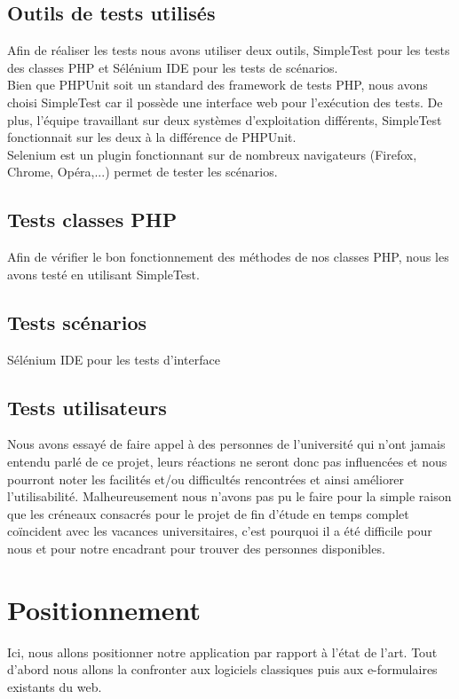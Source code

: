 \documentclass{sigplanconf}
\begin{document}
\subsection{Outils de tests utilisés}
Afin de réaliser les tests nous avons utiliser deux outils, SimpleTest pour les tests des classes PHP et Sélénium IDE pour les tests de scénarios.\\
Bien que PHPUnit soit un standard des framework de tests PHP, nous avons choisi SimpleTest car il possède une interface web pour l’exécution des tests. De plus, l’équipe travaillant sur deux systèmes d’exploitation différents, SimpleTest fonctionnait sur les deux à la différence de PHPUnit.\\
Selenium est un plugin fonctionnant sur de nombreux navigateurs (Firefox, Chrome, Opéra,...) permet de tester les scénarios.

\subsection{Tests classes PHP} %
Afin de vérifier le bon fonctionnement des méthodes de nos classes PHP, nous les avons testé en utilisant SimpleTest.

\subsection{Tests scénarios} %
Sélénium IDE pour les tests d’interface

\subsection{Tests utilisateurs}
Nous avons essayé de faire appel à des personnes de l’université qui n’ont jamais entendu parlé de ce projet, leurs réactions ne seront donc pas influencées et nous pourront noter les facilités et/ou difficultés rencontrées et ainsi améliorer l’utilisabilité. Malheureusement nous n’avons pas pu le faire pour la simple raison que les créneaux consacrés pour le projet de fin d'étude en temps complet coïncident avec les vacances universitaires, c’est pourquoi il a été difficile pour nous et pour notre encadrant pour trouver des personnes disponibles.

\section{Positionnement}
Ici, nous allons positionner notre application par rapport à l’état de l’art. Tout d’abord nous allons la confronter aux logiciels classiques puis aux e-formulaires existants du web.
\end{document}

